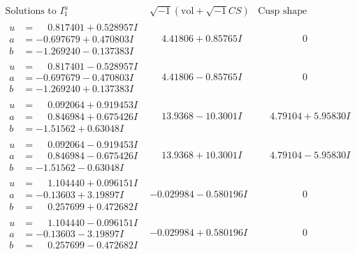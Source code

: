 \documentclass[1p]{elsarticle_modified}
\theoremstyle{definition}
\newcommand{\I}{\sqrt{-1}}
\begin{document}
$$\begin{array}{c|c|c}  
\text{Solutions to }I^u_{1}& \I (\text{vol} + \sqrt{-1}CS) & \text{Cusp shape}\\
 \hline 
\begin{aligned}
u &= \phantom{-}0.817401 + 0.528957 I \\
a &= -0.697679 + 0.470803 I \\
b &= -1.269240 - 0.137383 I\end{aligned}
 & \phantom{-}4.41806 + 0.85765 I & \phantom{-0.000000 } 0 \\ \hline\begin{aligned}
u &= \phantom{-}0.817401 - 0.528957 I \\
a &= -0.697679 - 0.470803 I \\
b &= -1.269240 + 0.137383 I\end{aligned}
 & \phantom{-}4.41806 - 0.85765 I & \phantom{-0.000000 } 0 \\ \hline\begin{aligned}
u &= \phantom{-}0.092064 + 0.919453 I \\
a &= \phantom{-}0.846984 + 0.675426 I \\
b &= -1.51562 + 0.63048 I\end{aligned}
 & \phantom{-}13.9368 - 10.3001 I & \phantom{-}4.79104 + 5.95830 I \\ \hline\begin{aligned}
u &= \phantom{-}0.092064 - 0.919453 I \\
a &= \phantom{-}0.846984 - 0.675426 I \\
b &= -1.51562 - 0.63048 I\end{aligned}
 & \phantom{-}13.9368 + 10.3001 I & \phantom{-}4.79104 - 5.95830 I \\ \hline\begin{aligned}
u &= \phantom{-}1.104440 + 0.096151 I \\
a &= -0.13603 + 3.19897 I \\
b &= \phantom{-}0.257699 + 0.472682 I\end{aligned}
 & -0.029984 - 0.580196 I & \phantom{-0.000000 } 0 \\ \hline\begin{aligned}
u &= \phantom{-}1.104440 - 0.096151 I \\
a &= -0.13603 - 3.19897 I \\
b &= \phantom{-}0.257699 - 0.472682 I\end{aligned}
 & -0.029984 + 0.580196 I & \phantom{-0.000000 } 0 \\ \hline\begin{aligned}

\end{aligned}
\end{array}$$
\end{document}
